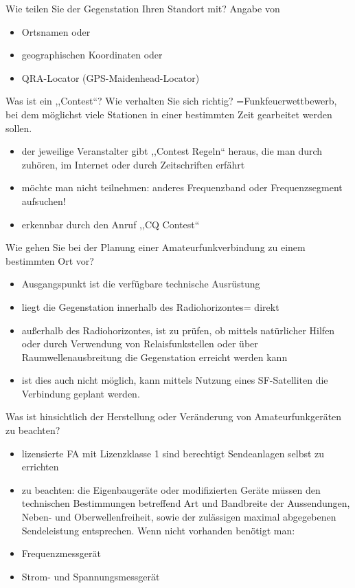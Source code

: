\documentclass[avery5371,grid,frame,a4paper]{flashcards}
\newcommand{\card}[3]{
  \begin{flashcard}[{\chap} -- #1]{#2}#3\end{flashcard}
}
\begin{document}
\card{70}{Wie teilen Sie der Gegenstation Ihren Standort mit?}{
  Angabe von
  \begin{itemize}
    \item Ortsnamen oder
    \item geographischen Koordinaten oder
    \item QRA-Locator (GPS-Maidenhead-Locator)
  \end{itemize}
}
\card{71}{Was ist ein ,,Contest``? Wie verhalten Sie sich richtig?}{
  \small
  =Funkfeuerwettbewerb, bei dem möglichst viele Stationen in einer bestimmten Zeit gearbeitet werden sollen.
  \begin{itemize}
    \item der jeweilige Veranstalter gibt ,,Contest Regeln`` heraus, die man durch zuhören, im Internet oder durch Zeitschriften erfährt
    \item möchte man nicht teilnehmen: anderes Frequenzband oder Frequenzsegment aufsuchen!
    \item erkennbar durch den Anruf ,,CQ Contest``
  \end{itemize}
}
\card{72}{Wie gehen Sie bei der Planung einer Amateurfunkverbindung zu einem bestimmten Ort vor?}{
  \small
  \begin{itemize}
    \item Ausgangspunkt ist die verfügbare technische Ausrüstung
    \item liegt die Gegenstation innerhalb des Radiohorizontes= direkt
    \item außerhalb des Radiohorizontes, ist zu prüfen, ob mittels natürlicher Hilfen oder durch Verwendung von Relaisfunkstellen oder über Raumwellenausbreitung die Gegenstation erreicht werden kann
    \item ist dies auch nicht möglich, kann mittels Nutzung eines SF-Satelliten die Verbindung geplant werden.
  \end{itemize}
}
\card{73}{Was ist hinsichtlich der Herstellung oder Veränderung von Amateurfunkgeräten zu beachten?}{
  \small
  \begin{itemize}
    \item lizensierte FA mit Lizenzklasse 1 sind berechtigt Sendeanlagen selbst zu errichten
    \item zu beachten: die Eigenbaugeräte oder modifizierten Geräte müssen den technischen Bestimmungen betreffend Art und Bandbreite der Aussendungen, Neben- und Oberwellenfreiheit, sowie der zulässigen maximal abgegebenen Sendeleistung entsprechen.  Wenn nicht vorhanden benötigt man:
    \item Frequenzmessgerät
    \item Strom- und Spannungsmessgerät
  \end{itemize}
}
\end{document}
